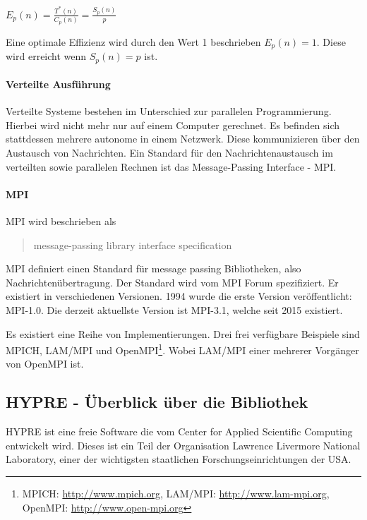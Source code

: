 \documentclass[a4paper,10pt]{article}
\begin{document}
\begin{center}
$E_p(n) = \frac{T^*(n)}{C_p(n)} = \frac{S_p(n)}{p}$
\end{center}

Eine optimale Effizienz wird durch den Wert 1 beschrieben $E_p(n) = 1$.
Diese wird erreicht wenn $S_p(n) = p$ ist.

\paragraph{Verteilte Ausführung}

Verteilte Systeme bestehen im Unterschied zur parallelen Programmierung.
Hierbei wird nicht mehr nur auf einem Computer gerechnet.
Es befinden sich stattdessen mehrere autonome in einem Netzwerk\cite{CS61A}.
Diese kommunizieren über den Austausch von Nachrichten.
Ein Standard für den Nachrichtenaustausch im verteilten sowie parallelen Rechnen ist das Message-Passing Interface - MPI\cite{MPIhome}.

\paragraph{MPI}


MPI wird beschrieben als \blockquote[{\cite[1]{mpi31report}}]{message-passing library interface specification}.


MPI definiert einen Standard für message passing Bibliotheken, also Nachrichtenübertragung.
Der Standard wird vom MPI Forum spezifiziert.
Er existiert in verschiedenen Versionen.
1994 wurde die erste Version veröffentlicht: MPI-1.0\cite[ii]{mpi31report}.
Die derzeit aktuellste Version ist MPI-3.1, welche seit 2015 existiert.



Es existiert eine Reihe von Implementierungen.
Drei frei verfügbare Beispiele sind MPICH, LAM/MPI und OpenMPI\footnote{MPICH: \url{http://www.mpich.org}, LAM/MPI: \url{http://www.lam-mpi.org}, OpenMPI: \url{http://www.open-mpi.org}}\cite[228]{ppRauberRuenger}.
Wobei LAM/MPI einer mehrerer Vorgänger von OpenMPI ist.




\subsection{HYPRE - Überblick über die Bibliothek}

HYPRE ist eine freie Software die vom Center for Applied Scientific Computing\cite{hypreCASC} entwickelt wird.
Dieses ist ein Teil der Organisation Lawrence Livermore National Laboratory\cite{hypreLLNL}, einer der wichtigsten staatlichen Forschungseinrichtungen der USA\cite{hypreDownload}.
\end{document}

